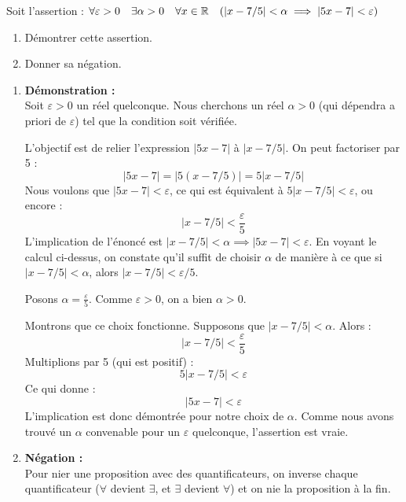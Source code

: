 \documentclass[solutions]{exercices}
\begin{document}

\begin{exercice}[\di]
	Soit l'assertion : $\forall \varepsilon > 0 \quad \exists \alpha > 0 \quad \forall x \in \mathbb{R} \quad (|x - 7/5| < \alpha \implies |5x - 7| < \varepsilon)$
	\begin{enumerate}
		\item Démontrer cette assertion.
		\item Donner sa négation.
	\end{enumerate}
\end{exercice}

\begin{solution}
	\begin{enumerate}
		\item \textbf{Démonstration :} \\
		      Soit $\varepsilon > 0$ un réel quelconque. Nous cherchons un réel $\alpha > 0$ (qui dépendra a priori de $\varepsilon$) tel que la condition soit vérifiée.

		      L'objectif est de relier l'expression $|5x - 7|$ à $|x - 7/5|$. On peut factoriser par 5 :
		      \[ |5x - 7| = |5(x - 7/5)| = 5|x - 7/5| \]
		      Nous voulons que $|5x - 7| < \varepsilon$, ce qui est équivalent à $5|x - 7/5| < \varepsilon$, ou encore :
		      \[ |x - 7/5| < \frac{\varepsilon}{5} \]
		      L'implication de l'énoncé est $|x - 7/5| < \alpha \implies |5x - 7| < \varepsilon$. En voyant le calcul ci-dessus, on constate qu'il suffit de choisir $\alpha$ de manière à ce que si $|x - 7/5| < \alpha$, alors $|x - 7/5| < \varepsilon/5$.

		      Posons $\alpha = \frac{\varepsilon}{5}$. Comme $\varepsilon > 0$, on a bien $\alpha > 0$.

		      Montrons que ce choix fonctionne. Supposons que $|x - 7/5| < \alpha$. Alors :
		      \[ |x - 7/5| < \frac{\varepsilon}{5} \]
		      Multiplions par 5 (qui est positif) :
		      \[ 5|x - 7/5| < \varepsilon \]
		      Ce qui donne :
		      \[ |5x - 7| < \varepsilon \]
		      L'implication est donc démontrée pour notre choix de $\alpha$. Comme nous avons trouvé un $\alpha$ convenable pour un $\varepsilon$ quelconque, l'assertion est vraie.

		\item \textbf{Négation :} \\
		      Pour nier une proposition avec des quantificateurs, on inverse chaque quantificateur ($\forall$ devient $\exists$, et $\exists$ devient $\forall$) et on nie la proposition à la fin.


\end{enumerate}
\end{solution}
\end{document}
